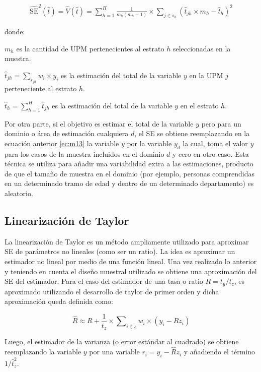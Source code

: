 \documentclass[12pt,twoside,spanish,a4paper]{book}\usepackage[]{graphicx}\usepackage[]{color}
\begin{document}
\begin{equation}
\begin{array}{cc}
\widehat {\text{SE}}^2(\hat t)=\hat V (\hat t)= \sum\limits_{h=1}^H\frac{1}{m_h(m_h-1)}\times \sum\limits_{j \in s_h}(\hat t_{jh}\times m_h-\hat t_h)^2
\label{ec:m13}
\end{array}
\end{equation}

donde:

$m_h$ es la cantidad de UPM pertenecientes al estrato $h$ seleccionadas en la muestra.

$\hat t_{jh}=\sum\nolimits_{s_{jh}} w_i\times y_i$ es la estimación del total de la variable $y$ en la UPM $j$ perteneciente al estrato $h$.

$\hat t_h=\sum\nolimits_{h=1}^H\hat t_{jh}$ es la estimación del total de la variable $y$ en el estrato $h$.

Por otra parte, si el objetivo es estimar el total de la variable $y$ pero para un dominio o área de estimación cualquiera $d$, el SE se obtiene reemplazando en la ecuación anterior \ref{ec:m13} la variable $y$ por la variable $y_d$ la cual, toma el valor $y$ para los casos de la muestra incluidos en el dominio $d$ y cero en otro caso. Esta técnica se utiliza para añadir una variabilidad extra a las estimaciones, producto de que el tamaño de muestra en el dominio (por ejemplo, personas comprendidas en un determinado tramo de edad y dentro de un determinado departamento) es aleatorio. 


\subsection{Linearización de Taylor \label{subsec:taylor}}

La linearización de Taylor es un método ampliamente utilizado para aproximar SE de parámetros no lineales (como ser un ratio). La idea es aproximar un estimador no lineal por medio de una función lineal. Una vez realizado lo anterior y teniendo en cuenta el diseño muestral utilizado se obtiene una aproximación del SE del estimador. Para el caso del estimador de una tasa o ratio $R=t_y/t_z$, es aproximado utilizando el desarrollo de taylor de primer orden y dicha aproximación queda definida como:

\[ \hat  R \approx R +\frac{1}{t_z}\times \sum\nolimits_{i\in s} w_i\times (y_i-Rz_i) \]

Luego, el estimador de la varianza (o error estándar al cuadrado) se obtiene reemplazando la variable $y$ por una variable $r_i=y_i-\hat Rz_i$ y añadiendo el término $1/\hat t_z^{2}$.
\end{document}
